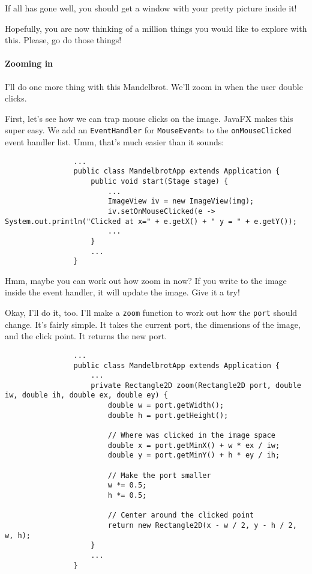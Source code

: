 \documentclass{article}
\begin{document}
            If all has gone well, you should get a window with your pretty picture inside it!
            
            Hopefully, you are now thinking of a million things you would like to explore with this.  Please, go do those things!
        
        \newpage
        \paragraph{Zooming in}
            I'll do one more thing with this Mandelbrot.  We'll zoom in when the user double clicks.
            
            First, let's see how we can trap mouse clicks on the image. JavaFX makes this super easy. We add an \texttt{EventHandler} for
            \texttt{MouseEvent}s to the \texttt{onMouseClicked} event handler list. Umm, that's much easier than it sounds:
                        
            \begin{verbatim}
                ... 
                public class MandelbrotApp extends Application {
                    public void start(Stage stage) {
                        ...
                        ImageView iv = new ImageView(img);
                        iv.setOnMouseClicked(e -> System.out.println("Clicked at x=" + e.getX() + " y = " + e.getY());
                        ...
                    }
                    ...
                }
            \end{verbatim}
            
            Hmm, maybe you can work out how zoom in now? If you write to the image inside the event handler, it will update the image. Give
            it a try!
            
            Okay, I'll do it, too. I'll make a \texttt{zoom} function to work out how the \texttt{port} should change. It's fairly simple.
            It takes the current port, the dimensions of the image, and the click point. It returns the new port.
            
                        
            \begin{verbatim}
                ... 
                public class MandelbrotApp extends Application {
                    ...
                    private Rectangle2D zoom(Rectangle2D port, double iw, double ih, double ex, double ey) {
                        double w = port.getWidth();
                        double h = port.getHeight();
        
                        // Where was clicked in the image space
                        double x = port.getMinX() + w * ex / iw;
                        double y = port.getMinY() + h * ey / ih;
        
                        // Make the port smaller
                        w *= 0.5;
                        h *= 0.5;

                        // Center around the clicked point
                        return new Rectangle2D(x - w / 2, y - h / 2, w, h);
                    }
                    ...
                }
            \end{verbatim}
            
\end{document}
